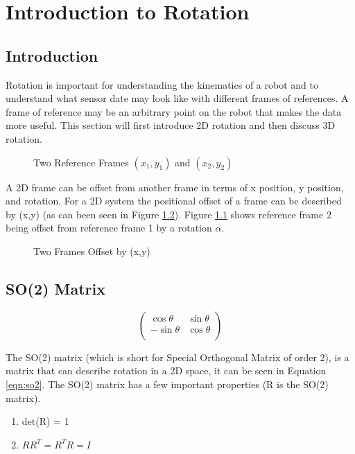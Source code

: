 \chapter{Introduction to Rotation}
\section{Introduction}
Rotation is important for understanding the kinematics of a robot and to understand what sensor date may look like with different frames of references. A frame of reference may be an arbitrary point on the robot that makes the data more useful. This section will first introduce 2D rotation and then discuss 3D rotation.

\begin{figure}[ht]
    \centering
    \caption{Two Reference Frames $(x_1,y_1)$ and $(x_2,y_2)$}
    \label{fig:tworefs}
\end{figure}

A 2D frame can be offset from another frame in terms of x position, y position, and rotation. For a 2D system the positional offset of a frame can be described by (x,y) (as can been seen in Figure \ref{fig:posoffset}). Figure \ref{fig:tworefs} shows reference frame 2 being offset from reference frame 1 by a rotation $\alpha$. 


\begin{figure}[ht]
    \centering
    \caption{Two Frames Offset by (x,y)}
    \label{fig:posoffset}
\end{figure}

\section{SO(2) Matrix}
\begin{equation}
\begin{pmatrix}
    \cos\theta & \sin\theta \\
    -\sin\theta & \cos\theta\\
\end{pmatrix} 
\label{eqn:so2}
\end{equation}

The SO(2) matrix (which is short for Special Orthogonal Matrix of order 2), is a matrix that can describe rotation in a 2D space, it can be seen in Equation \ref{eqn:so2}. The SO(2) matrix has a few important properties (R is the SO(2) matrix).
\begin{enumerate}
    \item det(R) = 1
    \item $RR^T = R^TR = I$
\end{enumerate}

